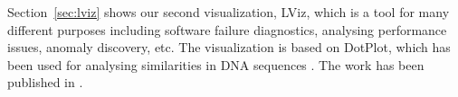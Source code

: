 Section~\ref{sec:lviz} shows our second visualization, LViz, which
is a tool for many different purposes including software failure diagnostics,
analysing performance issues, anomaly discovery, etc.
The visualization is based on DotPlot, which has been used for
analysing similarities in DNA sequences \cite{maizel1981enhanced}.
The work has been published in \cite{wu2010visualizing}.

